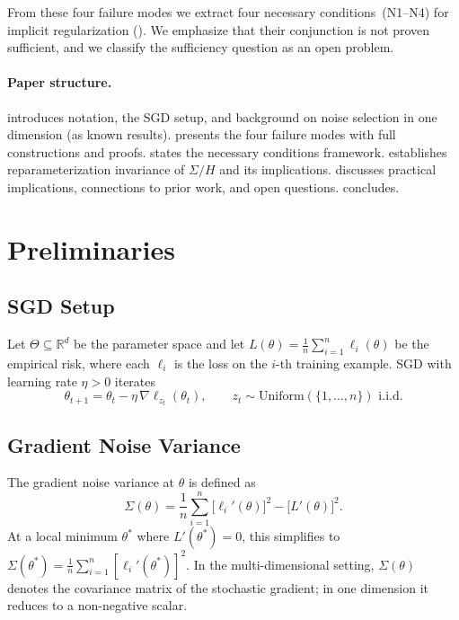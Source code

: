 \documentclass[11pt,a4paper]{article}
\newcommand{\R}{\mathbb{R}}
\begin{document}
From these four failure modes we extract four necessary conditions~(N1--N4)
for implicit regularization ().  We emphasize that their
conjunction is not proven sufficient, and we classify the sufficiency question
as an open problem.

\paragraph{Paper structure.}
 introduces notation, the SGD setup, and background on noise
selection in one dimension (as known results).
 presents the four failure modes with full constructions and
proofs.
 states the necessary conditions framework.
 establishes reparameterization invariance of $\Sigma/H$
and its implications.
 discusses practical implications, connections to prior
work, and open questions.
 concludes.

\section{Preliminaries}
\label{sec:prelim}

\subsection{SGD Setup}
\label{sec:sgd-setup}

Let $\Theta \subseteq \R^d$ be the parameter space and let
$L(\theta) = \frac{1}{n}\sum_{i=1}^{n} \ell_i(\theta)$ be the empirical risk,
where each $\ell_i$ is the loss on the $i$-th training example.
SGD with learning rate $\eta > 0$ iterates
\begin{equation}\label{eq:sgd}
  \theta_{t+1} = \theta_t - \eta\, \nabla \ell_{z_t}(\theta_t),
  \qquad z_t \sim \mathrm{Uniform}(\{1,\dots,n\}) \text{ i.i.d.}
\end{equation}

\subsection{Gradient Noise Variance}
\label{sec:noise-variance}

The gradient noise variance at $\theta$ is defined as
\begin{equation}\label{eq:sigma}
  \Sigma(\theta)
  = \frac{1}{n}\sum_{i=1}^{n}\bigl[\ell_i'(\theta)\bigr]^2
    - \bigl[L'(\theta)\bigr]^2.
\end{equation}
At a local minimum $\theta^*$ where $L'(\theta^*)=0$, this simplifies to
$\Sigma(\theta^*) = \frac{1}{n}\sum_{i=1}^{n}[\ell_i'(\theta^*)]^2$.
In the multi-dimensional setting, $\Sigma(\theta)$ denotes the covariance
matrix of the stochastic gradient; in one dimension it reduces to a
non-negative scalar.
\end{document}
